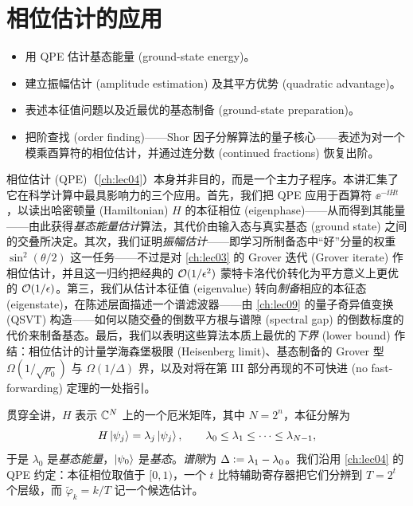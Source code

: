\chapter{相位估计的应用}
\label{ch:lec05}

\begin{objectives}
\begin{itemize}[leftmargin=1.4em,nosep]
  \item 用 QPE 估计基态能量 (ground-state energy)。
  \item 建立振幅估计 (amplitude estimation) 及其平方优势 (quadratic advantage)。
  \item 表述本征值问题以及近最优的基态制备 (ground-state preparation)。
  \item 把阶查找 (order finding)——Shor 因子分解算法的量子核心——表述为对一个模乘酉算符的相位估计，并通过连分数 (continued fractions) 恢复出阶。
\end{itemize}
\end{objectives}

相位估计 (QPE)（\cref{ch:lec04}）本身并非目的，而是一个主力子程序。本讲汇集了它在科学计算中最具影响力的三个应用。首先，我们把 QPE 应用于酉算符 $\ee^{-\ii Ht}$，以读出哈密顿量 (Hamiltonian) $H$ 的本征相位 (eigenphase)——从而得到其能量——由此获得\emph{基态能量估计}算法，其代价由输入态与真实基态 (ground state) 之间的交叠所决定。其次，我们证明\emph{振幅估计}——即学习所制备态中“好”分量的权重 $\sin^2(\theta/2)$ 这一任务——不过是对 \cref{ch:lec03} 的 Grover 迭代 (Grover iterate) 作相位估计，并且这一归约把经典的 $\mathcal{O}(1/\epsilon^2)$ 蒙特卡洛代价转化为平方意义上更优的 $\mathcal{O}(1/\epsilon)$。第三，我们从估计本征值 (eigenvalue) 转向\emph{制备}相应的本征态 (eigenstate)，在陈述层面描述一个谱滤波器——由 \cref{ch:lec09} 的量子奇异值变换 (QSVT) 构造——如何以随交叠的倒数平方根与谱隙 (spectral gap) 的倒数标度的代价来制备基态。最后，我们以表明这些算法本质上最优的\emph{下界} (lower bound) 作结：相位估计的计量学海森堡极限 (Heisenberg limit)、基态制备的 Grover 型 $\Omega(1/\sqrt{p_0})$ 与 $\Omega(1/\Delta)$ 界，以及对将在第 III 部分再现的不可快进 (no fast-forwarding) 定理的一处指引。

贯穿全讲，$H$ 表示 $\mathbb{C}^N$ 上的一个厄米矩阵，其中 $N=2^n$，本征分解为
\[
  H\ket{\psi_j}=\lambda_j\ket{\psi_j},
  \qquad \lambda_0\le\lambda_1\le\cdots\le\lambda_{N-1},
\]
于是 $\lambda_0$ 是\emph{基态能量}，$\ket{\psi_0}$ 是\emph{基态}。\emph{谱隙}为 $\Delta\vcentcolon=\lambda_1-\lambda_0$。我们沿用 \cref{ch:lec04} 的 QPE 约定：本征相位取值于 $[0,1)$，一个 $t$ 比特辅助寄存器把它们分辨到 $T=2^t$ 个层级，而 $\tilde\varphi_{k}=k/T$ 记一个候选估计。


